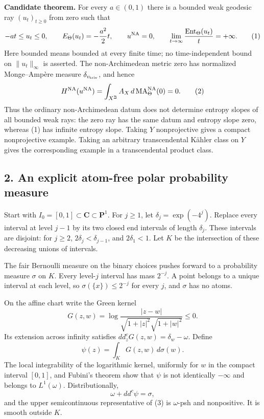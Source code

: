 \documentclass[
]{article}
\begin{document}
\textbf{Candidate theorem.} For every \(a\in(0,1)\) there is a bounded
weak geodesic ray \((u_t)_{t\geq0}\) from zero such that \[
 -at\leq u_t\leq0,\qquad E_\Theta(u_t)=-\frac{a^2}{2}t,
 \qquad u^{\rm NA}=0,
 \qquad \lim_{t\to\infty}\frac{\operatorname{Ent}_\Theta(u_t)}{t}=+\infty.
 \tag{1}
\] Here bounded means bounded at every finite time; no time-independent
bound on \(\|u_t\|_\infty\) is asserted. The non-Archimedean metric zero
has normalized Monge--Ampère measure \(\delta_{v_{\rm triv}}\), and
hence \[
 H^{\rm NA}(u^{\rm NA})=\int_{X^{\beth}} A_X\,d\operatorname{MA}^{\rm NA}_\Theta(0)=0.
 \tag{2}
\] Thus the ordinary non-Archimedean datum does not determine entropy
slopes of all bounded weak rays: the zero ray has the same datum and
entropy slope zero, whereas (1) has infinite entropy slope. Taking \(Y\)
nonprojective gives a compact nonprojective example. Taking an arbitrary
transcendental Kähler class on \(Y\) gives the corresponding example in
a transcendental product class.

\subsection{2. An explicit atom-free polar probability
measure}\label{an-explicit-atom-free-polar-probability-measure}

Start with \(I_0=[0,1]\subset\mathbf C\subset\mathbf P^1\). For
\(j\geq1\), let \(\delta_j=\exp(-4^j)\). Replace every interval at level
\(j-1\) by its two closed end intervals of length \(\delta_j\). These
intervals are disjoint: for \(j\geq2\), \(2\delta_j<\delta_{j-1}\), and
\(2\delta_1<1\). Let \(K\) be the intersection of these decreasing
unions of intervals.

The fair Bernoulli measure on the binary choices pushes forward to a
probability measure \(\sigma\) on \(K\). Every level-\(j\) interval has
mass \(2^{-j}\). A point belongs to a unique interval at each level, so
\(\sigma(\{x\})\leq2^{-j}\) for every \(j\), and \(\sigma\) has no
atoms.

On the affine chart write the Green kernel \[
 G(z,w)=\log\frac{|z-w|}{\sqrt{1+|z|^2}\sqrt{1+|w|^2}}\leq0.
\] Its extension across infinity satisfies
\(dd_z^cG(z,w)=\delta_w-\omega\). Define \[
 \psi(z)=\int_KG(z,w)\,d\sigma(w).
 \tag{3}
\] The local integrability of the logarithmic kernel, uniformly for
\(w\) in the compact interval \([0,1]\), and Fubini's theorem show that
\(\psi\) is not identically \(-\infty\) and belongs to \(L^1(\omega)\).
Distributionally, \[
 \omega+dd^c\psi=\sigma,
\] and the upper semicontinuous representative of (3) is \(\omega\)-psh
and nonpositive. It is smooth outside \(K\).
\end{document}
